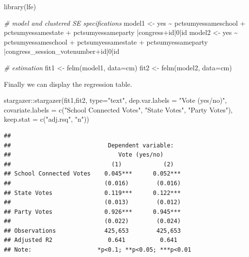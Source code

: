 \documentclass[
  12pt,
]{style/krantz}
\newenvironment{Shaded}{\begin{snugshade}}{\end{snugshade}}
\newcommand{\AttributeTok}[1]{\textcolor[rgb]{0.77,0.63,0.00}{#1}}
\newcommand{\CommentTok}[1]{\textcolor[rgb]{0.56,0.35,0.01}{\textit{#1}}}
\newcommand{\DecValTok}[1]{\textcolor[rgb]{0.00,0.00,0.81}{#1}}
\newcommand{\FunctionTok}[1]{\textcolor[rgb]{0.00,0.00,0.00}{#1}}
\newcommand{\NormalTok}[1]{#1}
\newcommand{\OtherTok}[1]{\textcolor[rgb]{0.56,0.35,0.01}{#1}}
\newcommand{\SpecialCharTok}[1]{\textcolor[rgb]{0.00,0.00,0.00}{#1}}
\newcommand{\StringTok}[1]{\textcolor[rgb]{0.31,0.60,0.02}{#1}}
\begin{document}
\begin{Shaded}
\begin{Highlighting}[]
\FunctionTok{library}\NormalTok{(lfe)}

\CommentTok{\# model and clustered SE specifications}
\NormalTok{model1 }\OtherTok{\textless{}{-}}\NormalTok{ yes }\SpecialCharTok{\textasciitilde{}}\NormalTok{ pctsumyessameschool }\SpecialCharTok{+}\NormalTok{ pctsumyessamestate }\SpecialCharTok{+}\NormalTok{ pctsumyessameparty }\SpecialCharTok{|}\NormalTok{congress}\SpecialCharTok{+}\NormalTok{id}\SpecialCharTok{|}\DecValTok{0}\SpecialCharTok{|}\NormalTok{id}
\NormalTok{model2 }\OtherTok{\textless{}{-}}\NormalTok{ yes }\SpecialCharTok{\textasciitilde{}}\NormalTok{ pctsumyessameschool }\SpecialCharTok{+}\NormalTok{ pctsumyessamestate }\SpecialCharTok{+}\NormalTok{ pctsumyessameparty }\SpecialCharTok{|}\NormalTok{congress\_session\_votenumber}\SpecialCharTok{+}\NormalTok{id}\SpecialCharTok{|}\DecValTok{0}\SpecialCharTok{|}\NormalTok{id}

\CommentTok{\# estimation}
\NormalTok{fit1 }\OtherTok{\textless{}{-}} \FunctionTok{felm}\NormalTok{(model1, }\AttributeTok{data=}\NormalTok{cm)}
\NormalTok{fit2 }\OtherTok{\textless{}{-}} \FunctionTok{felm}\NormalTok{(model2, }\AttributeTok{data=}\NormalTok{cm)}
\end{Highlighting}
\end{Shaded}

Finally we can display the regression table.

\begin{Shaded}
\begin{Highlighting}[]
\NormalTok{stargazer}\SpecialCharTok{::}\FunctionTok{stargazer}\NormalTok{(fit1,fit2,}
                     \AttributeTok{type=}\StringTok{"text"}\NormalTok{,}
                     \AttributeTok{dep.var.labels =} \StringTok{"Vote (yes/no)"}\NormalTok{,}
                     \AttributeTok{covariate.labels =} \FunctionTok{c}\NormalTok{(}\StringTok{"School Connected Votes"}\NormalTok{,}
                                          \StringTok{"State Votes"}\NormalTok{,}
                                          \StringTok{"Party Votes"}\NormalTok{),}
                     \AttributeTok{keep.stat =} \FunctionTok{c}\NormalTok{(}\StringTok{"adj.rsq"}\NormalTok{, }\StringTok{"n"}\NormalTok{))}
\end{Highlighting}
\end{Shaded}

\begin{verbatim}
## 
##                            Dependent variable:     
##                               Vote (yes/no)        
##                             (1)            (2)     
## School Connected Votes    0.045***      0.052***   
##                           (0.016)        (0.016)   
## State Votes               0.119***      0.122***   
##                           (0.013)        (0.012)   
## Party Votes               0.926***      0.945***   
##                           (0.022)        (0.024)   
## Observations              425,653        425,653   
## Adjusted R2                0.641          0.641    
## Note:                   *p<0.1; **p<0.05; ***p<0.01
\end{verbatim}
\end{document}
